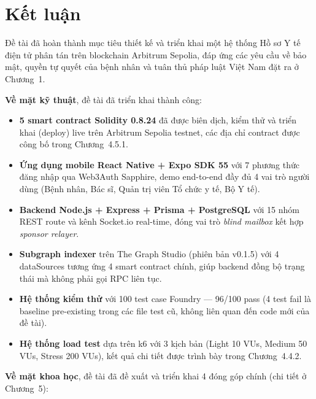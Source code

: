 \documentclass[../DoAn]{subfiles}
\begin{document}

\section{Kết luận}

Đề tài đã hoàn thành mục tiêu thiết kế và triển khai một hệ thống Hồ sơ Y tế điện tử phân tán trên blockchain Arbitrum Sepolia, đáp ứng các yêu cầu về bảo mật, quyền tự quyết của bệnh nhân và tuân thủ pháp luật Việt Nam đặt ra ở Chương~1.

\textbf{Về mặt kỹ thuật}, đề tài đã triển khai thành công:

\begin{itemize}
    \item \textbf{5 smart contract Solidity 0.8.24} đã được biên dịch, kiểm thử và triển khai (deploy) live trên Arbitrum Sepolia testnet, các địa chỉ contract được công bố trong Chương~4.5.1.
    \item \textbf{Ứng dụng mobile React Native + Expo SDK 55} với 7 phương thức đăng nhập qua Web3Auth Sapphire, demo end-to-end đầy đủ 4 vai trò người dùng (Bệnh nhân, Bác sĩ, Quản trị viên Tổ chức y tế, Bộ Y tế).
    \item \textbf{Backend Node.js + Express + Prisma + PostgreSQL} với 15 nhóm REST route và kênh Socket.io real-time, đóng vai trò \textit{blind mailbox} kết hợp \textit{sponsor relayer}.
    \item \textbf{Subgraph indexer} trên The Graph Studio (phiên bản v0.1.5) với 4 dataSources tương ứng 4 smart contract chính, giúp backend đồng bộ trạng thái mà không phải gọi RPC liên tục.
    \item \textbf{Hệ thống kiểm thử} với 100 test case Foundry --- 96/100 pass (4 test fail là baseline pre-existing trong các file test cũ, không liên quan đến code mới của đề tài).
    \item \textbf{Hệ thống load test} dựa trên k6 với 3 kịch bản (Light 10 VUs, Medium 50 VUs, Stress 200 VUs), kết quả chi tiết được trình bày trong Chương~4.4.2.
\end{itemize}

\textbf{Về mặt khoa học}, đề tài đã đề xuất và triển khai 4 đóng góp chính (chi tiết ở Chương~5):
\end{document}

